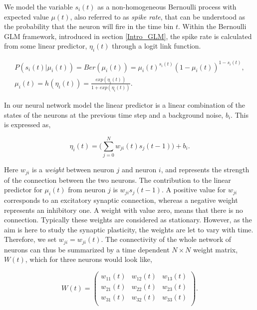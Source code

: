 We model the variable $s_i(t)$ as a non-homogeneous Bernoulli process with expected value $\mu (t)$, also referred to as \textit{spike rate}, that can be understood as the probability that the neuron will fire in the time bin $t$. Within the Bernoulli GLM framework, introduced in section \ref{Intro_GLM}, the spike rate is calculated from some linear predictor, $\eta_i(t)$ through a logit link function. 

\begin{equation}
\label{eq:prob}
\begin{split}
P(s_i(t)|\mu_i(t)) =  Ber(\mu_i(t)) = \mu_i(t)^{s_i(t)}(1-\mu_i(t))^{1-s_i(t)}, \\ \mu_i(t) = h(\eta_i(t))= \frac{exp(\eta_i(t))}{1+exp(\eta_i(t))}.
\end{split}
\end{equation}

In our neural network model the linear predictor is a linear combination of the states of the neurons at the previous time step and a background noise, $b_i$. This is expressed as,

\begin{equation}
\label{eq:lin_pred}
    \eta_i(t) = \Big (\sum_{j=0}^{N}  w_{ji}(t)s_j(t-1) \Big) + b_i.
\end{equation}

Here $w_{ji}$ is a \textit{weight} between neuron $j$ and neuron $i$, and represents the strength of the connection between the two neurons. The contribution to the linear predictor for $\mu_i(t)$ from neuron $j$ is $w_{ji}s_j(t-1)$. A positive value for $w_{ji}$ corresponds to an excitatory synaptic connection, whereas a negative weight represents an inhibitory one. A weight with value zero, means that there is no connection. Typically these weights are considered as stationary. However, as the aim is here to study the synaptic plasticity, the weights are let to vary with time. Therefore, we set $w_{ji} = w_{ji}(t)$. The connectivity of the whole network of neurons can thus be summarized by a time dependent $N \times N$ weight matrix, $W(t)$, which for three neurons would look like, 

\begin{equation*}
W(t) = 
\begin{pmatrix}
w_{11}(t) & w_{12}(t) & w_{13}(t)\\
w_{21}(t) & w_{22}(t) & w_{23}(t)\\
w_{31}(t) & w_{32}(t) & w_{33}(t)\\
\end{pmatrix}.
\end{equation*}

